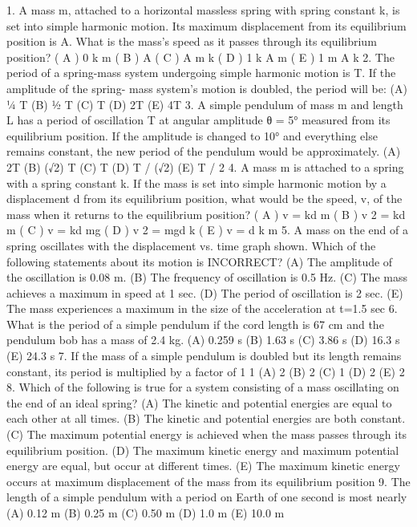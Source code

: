 1.
A mass m, attached to a horizontal massless spring with spring constant k, is set into simple harmonic motion.
Its maximum displacement from its equilibrium position is A. What is the mass’s speed as it passes through its
equilibrium position?
( A ) 0
k
m
( B ) A
( C ) A
m
k
( D )
1 k
A m
( E )
1 m
A k
2. The period of a spring-mass system undergoing simple harmonic motion is T. If the amplitude of the spring-
mass system’s motion is doubled, the period will be:
(A) 1⁄4 T (B) 1⁄2 T (C) T (D) 2T (E) 4T
3. A simple pendulum of mass m and length L has a period of oscillation T at angular amplitude θ = 5° measured
from its equilibrium position. If the amplitude is changed to 10° and everything else remains constant, the new
period of the pendulum would be approximately.
(A) 2T (B) (√2) T (C) T (D) T / (√2) (E) T / 2
4. A mass m is attached to a spring with a spring constant k. If the mass is set into simple harmonic motion by a
displacement d from its equilibrium position, what would be the speed, v, of the mass when it returns to the
equilibrium position?
( A ) v =
kd
m
( B ) v 2 =
kd
m
( C ) v =
kd
mg
( D ) v 2 =
mgd
k
( E ) v = d
k
m
5. A mass on the end of a spring oscillates with the displacement vs.
time graph shown. Which of the following statements about its
motion is INCORRECT?
(A) The amplitude of the oscillation is 0.08 m.
(B) The frequency of oscillation is 0.5 Hz.
(C) The mass achieves a maximum in speed at 1 sec.
(D) The period of oscillation is 2 sec.
(E) The mass experiences a maximum in the size of the
acceleration at t=1.5 sec
6. What is the period of a simple pendulum if the cord length is 67 cm and the pendulum bob has a mass of 2.4 kg.
(A) 0.259 s (B) 1.63 s
(C) 3.86 s
(D) 16.3 s
(E) 24.3 s
7.
If the mass of a simple pendulum is doubled but its length remains constant, its period is multiplied by a factor of
1
1
(A) 2
(B)
2
(C) 1
(D)
2
(E) 2
8. Which of the following is true for a system consisting of a mass oscillating on the end of an ideal spring?
(A) The kinetic and potential energies are equal to each other at all times.
(B) The kinetic and potential energies are both constant.
(C) The maximum potential energy is achieved when the mass passes through its equilibrium position.
(D) The maximum kinetic energy and maximum potential energy are equal, but occur at different times.
(E) The maximum kinetic energy occurs at maximum displacement of the mass from its equilibrium position
9. The length of a simple pendulum with a period on Earth of one second is most nearly
(A) 0.12 m
(B) 0.25 m (C) 0.50 m
(D) 1.0 m
(E) 10.0 m




